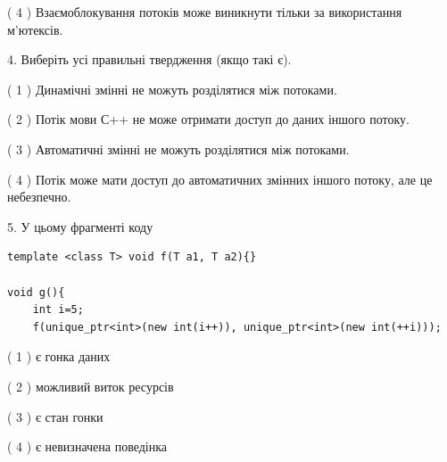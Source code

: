 \documentclass[12pt, ukrainian]{article}
\begin{document}
\begin {large}
{( 4 ) Взаємоблокування потоків може виникнути тільки за використання м’ютексів.%


4. Виберіть усі правильні твердження (якщо такі є).\par
\vspace{2mm}

( 1 ) Динамічні змінні не можуть розділятися між потоками.%

( 2 ) Потік мови С++ не може отримати доступ до даних іншого потоку.%

( 3 ) Автоматичні змінні не можуть розділятися між потоками.%

( 4 ) Потік може мати доступ до автоматичних змінних іншого потоку, але це небезпечно.%


5. У цьому фрагменті коду
\begin{verbatim}
template <class T> void f(T a1, T a2){}

void g(){
    int i=5;
    f(unique_ptr<int>(new int(i++)), unique_ptr<int>(new int(++i)));
\end{verbatim}

( 1 ) є гонка даних%

( 2 ) можливий виток ресурсів%

( 3 ) є стан гонки%

( 4 ) є невизначена поведінка%
}
\end {large}
\end{document}
